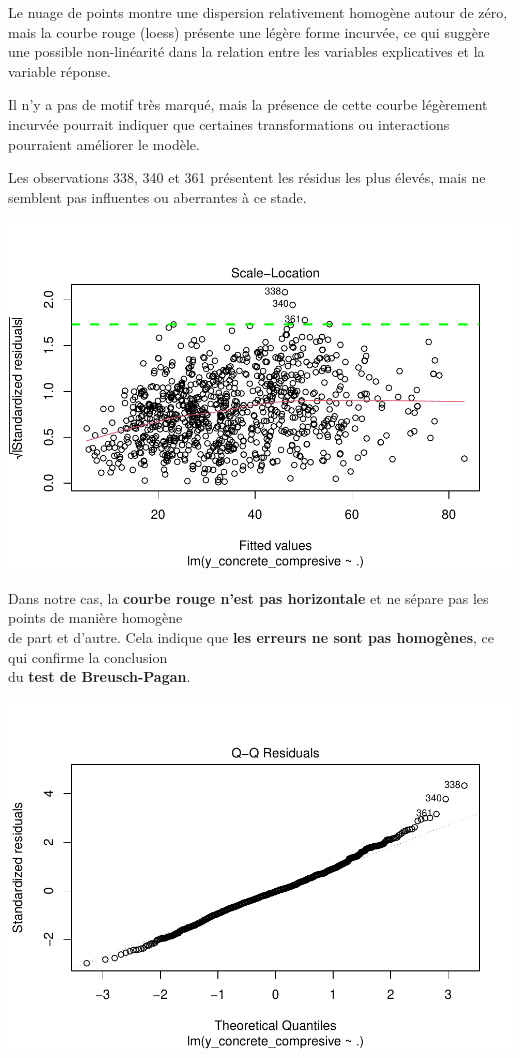 \documentclass[
  12pt,
]{article}
\begin{document}
Le nuage de points montre une dispersion relativement homogène autour de
zéro, mais la courbe rouge (loess) présente une légère forme incurvée,
ce qui suggère une possible non-linéarité dans la relation entre les
variables explicatives et la variable réponse.

Il n'y a pas de motif très marqué, mais la présence de cette courbe
légèrement incurvée pourrait indiquer que certaines transformations ou
interactions pourraient améliorer le modèle.

Les observations 338, 340 et 361 présentent les résidus les plus élevés,
mais ne semblent pas influentes ou aberrantes à ce stade.

\includegraphics{rmd_final_files/figure-latex/unnamed-chunk-43-1.pdf}

Dans notre cas, la \textbf{courbe rouge n'est pas horizontale} et ne
sépare pas les points de manière homogène\\
de part et d'autre. Cela indique que \textbf{les erreurs ne sont pas
homogènes}, ce qui confirme la conclusion\\
du \textbf{test de Breusch-Pagan}.

\includegraphics{rmd_final_files/figure-latex/unnamed-chunk-44-1.pdf}
\end{document}
